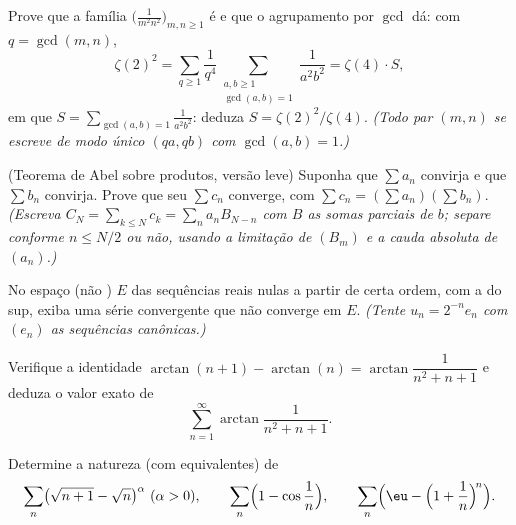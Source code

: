\begin{exercise}[$\star\star$]\label{exo:b2:series:7}
Prove que a família $\bigl(\frac{1}{m^2 n^2}\bigr)_{m,n \geq 1}$
é  e que o agrupamento por $\gcd$ dá: com $q = \gcd(m,n)$,
\[
\zeta(2)^2 = \sum_{q\geq1} \frac{1}{q^4}
\sum_{\substack{a,b \geq 1\\ \gcd(a,b)=1}} \frac{1}{a^2b^2}
= \zeta(4) \cdot S,
\]
em que $S = \sum_{\gcd(a,b)=1} \frac{1}{a^2b^2}$: deduza $S =
\zeta(2)^2/\zeta(4)$. \emph{(Todo par $(m,n)$ se escreve de modo único
$(qa, qb)$ com $\gcd(a,b) = 1$.)}
\end{exercise}

\begin{exercise}[$\star\star\star$]\label{exo:b2:series:8}
(Teorema de Abel sobre produtos, versão leve) Suponha que $\sum a_n$
convirja  e que $\sum b_n$ convirja. Prove que seu
 $\sum c_n$ converge, com $\sum c_n = (\sum
a_n)(\sum b_n)$. \emph{(Escreva $C_N = \sum_{k\leq N} c_k = \sum_n
a_n B_{N-n}$ com $B$ as somas parciais de $b$; separe conforme
$n \leq N/2$ ou não, usando a limitação de $(B_m)$ e a
cauda absoluta de $(a_n)$.)}
\end{exercise}

\begin{exercise}[$\star\star\star$]\label{exo:b2:series:9}
No espaço (não ) $E$ das sequências reais nulas a partir de certa ordem,
com a  do sup, exiba uma série  convergente que não
converge em $E$. \emph{(Tente $u_n = 2^{-n} e_n$ com $(e_n)$ as
sequências canônicas.)}
\end{exercise}

\begin{exercise}[$\star\star$]\label{exo:b2:series:10}
Verifique a identidade $\arctan(n+1) - \arctan(n) =
\arctan\dfrac{1}{n^2 + n + 1}$ e deduza o valor exato de
\[
\sum_{n=1}^{\infty} \arctan\frac{1}{n^2 + n + 1} .
\]
\end{exercise}

\begin{exercise}[$\star\star$]\label{exo:b2:series:11}
Determine a natureza (com equivalentes) de
\[
\sum_n \bigl(\sqrt{n+1} - \sqrt n\bigr)^{\alpha}
\ (\alpha > 0), \qquad
\sum_n \Bigl(1 - \cos\frac1n\Bigr), \qquad
\sum_n \Bigl(\eu - \Bigl(1 + \frac1n\Bigr)^{\!n}\Bigr).
\]
\end{exercise}


